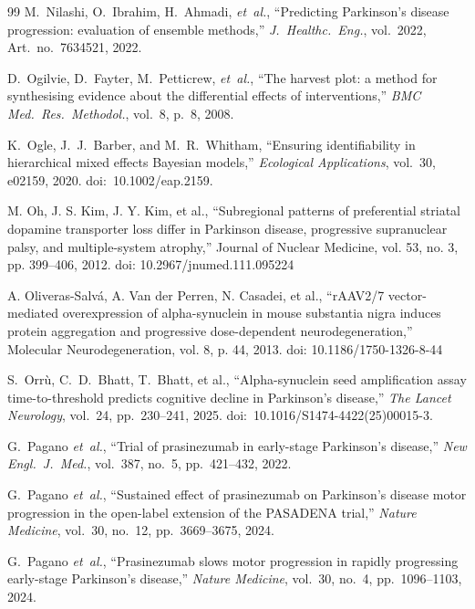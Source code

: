 \begin{thebibliography}{99}
M.~Nilashi, O.~Ibrahim, H.~Ahmadi, \textit{et~al.}, ``Predicting Parkinson's disease progression: evaluation of ensemble methods,'' \textit{J.\ Healthc.\ Eng.}, vol.~2022, Art.\ no.~7634521, 2022.


D.~Ogilvie, D.~Fayter, M.~Petticrew, \textit{et~al.}, ``The harvest plot: a method for synthesising evidence about the differential effects of interventions,'' \textit{BMC Med.\ Res.\ Methodol.}, vol.~8, p.~8, 2008.


K.~Ogle, J.~J.~Barber, and M.~R.~Whitham, ``Ensuring identifiability in hierarchical mixed effects Bayesian models,'' \textit{Ecological Applications}, vol.~30, e02159, 2020. doi:~10.1002/eap.2159.

 M. Oh, J. S. Kim, J. Y. Kim, et al., ``Subregional patterns of preferential striatal dopamine transporter loss differ in Parkinson disease, progressive supranuclear palsy, and multiple-system atrophy,'' Journal of Nuclear Medicine, vol. 53, no. 3, pp. 399--406, 2012. doi: 10.2967/jnumed.111.095224

 A. Oliveras-Salv\'a, A. Van der Perren, N. Casadei, et al., ``rAAV2/7 vector-mediated overexpression of alpha-synuclein in mouse substantia nigra induces protein aggregation and progressive dose-dependent neurodegeneration,'' Molecular Neurodegeneration, vol. 8, p. 44, 2013. doi: 10.1186/1750-1326-8-44

S.~Orrù, C.~D.~Bhatt, T.~Bhatt, et al., ``Alpha-synuclein seed amplification assay time-to-threshold predicts cognitive decline in Parkinson's disease,'' \textit{The Lancet Neurology}, vol.~24, pp.~230--241, 2025. doi:~10.1016/S1474-4422(25)00015-3.

G.~Pagano \textit{et~al.}, ``Trial of prasinezumab in early-stage Parkinson's disease,'' \textit{New Engl.~J.~Med.}, vol.~387, no.~5, pp.~421--432, 2022.

G.~Pagano \textit{et~al.}, ``Sustained effect of prasinezumab on Parkinson's disease motor progression in the open-label extension of the PASADENA trial,'' \textit{Nature Medicine}, vol.~30, no.~12, pp.~3669--3675, 2024.

G.~Pagano \textit{et~al.}, ``Prasinezumab slows motor progression in rapidly progressing early-stage Parkinson's disease,'' \textit{Nature Medicine}, vol.~30, no.~4, pp.~1096--1103, 2024.


\end{thebibliography}
